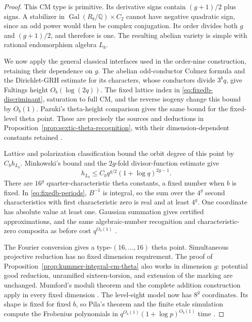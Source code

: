 \documentclass[11pt]{article}
\theoremstyle{definition}
\theoremstyle{remark}
\begin{document}
\begin{proof}
This CM type is primitive. Its derivative signs contain
\((g+1)/2\) plus signs. A stabilizer in
\(\operatorname{Gal}(R_b/\mathbb Q)\times C_2\) cannot have
negative quadratic sign, since an odd power would then be
complex conjugation. Its order divides both \(g\) and
\((g+1)/2\), and therefore is one. The resulting abelian
variety is simple with rational endomorphism algebra \(L_b\).

We now apply the general classical interfaces used in the
order-nine construction, retaining their dependence on \(g\).
The abelian odd-conductor Colmez formula and the Dirichlet-GRH
estimate for its characters, whose conductors divide \(3^bq\),
give Faltings height \(O_b(\log(2q))\). The fixed lattice
index in \eqref{eq:fixedb-discriminant}, saturation to full CM, and the reverse isogeny
change this bound by \(O_b(1)\). Pazuki's theta-height
comparison gives the same bound for the fixed-level theta
point. These are precisely the sources and deductions in
Proposition~\ref{prop:sextic-theta-recognition}, with their
dimension-dependent constants retained
\citep{Colmez1993,Wei2021,Pazuki2012}.

Lattice and polarization classification bound the orbit degree
of this point by \(C_bh_{L_b}\). Minkowski's bound and the
\(2g\)-fold divisor-function estimate give
\[
 h_{L_b}\le C_bq^{g/2}(1+\log q)^{2g-1}.             \label{eq:fixedb-class-number}
\]
There are \(16^g\) quarter-characteristic theta constants,
a fixed number when \(b\) is fixed. In \eqref{eq:fixedb-periods}, \(B^{-1}\) is
integral, so the sum over the \(4^g\) second characteristics
with first characteristic zero is real and at least \(4^g\).
One coordinate has absolute value at least one. Gaussian
summation gives certified approximations, and the same
algebraic-number recognition and characteristic-zero
composita as before cost \(q^{O_b(1)}\)
\citep{KannanLenstraLovasz1988,Lenstra1983}.

The Fourier conversion gives a type-\((16,\ldots,16)\)
theta point. Simultaneous projective reduction has no fixed
dimension requirement. The proof of
Proposition~\ref{prop:kummer-integral-cm-theta} also works in
dimension \(g\): potential good reduction, unramified
sixteen-torsion, and extension of the marking are unchanged.
Mumford's moduli theorem and the complete addition construction
apply in every fixed dimension \citep{Mumford1966,Mumford1967}.
The level-eight model now has \(8^g\) coordinates. Its shape
is fixed for fixed \(b\), so Pila's theorem and the finite
etale simulation compute the Frobenius polynomials in
\(q^{O_b(1)}(1+\log p)^{O_b(1)}\) time
\citep[Section~4, author pp.~12--14]{Pila1990}.


\end{proof}
\end{document}
